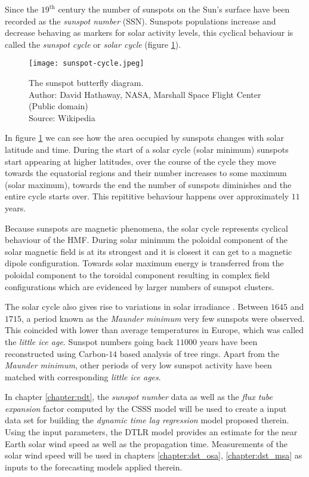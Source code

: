 Since the $19^{\text{th}}$ century the number of sunspots on the Sun's surface have been recorded as the 
\emph{sunspot number} (SSN). Sunspots populations increase and decrease behaving as markers for solar activity levels, 
this cyclical behaviour is called the \emph{sunspot cycle} or \emph{solar cycle} (figure \ref{fig:SolarCycle}). 

\begin{figure}
    \noindent\texttt{[image: sunspot-cycle.jpeg]}
    \caption{\small{The sunspot butterfly diagram.  \\ 
    Author: David Hathaway, NASA, Marshall Space Flight Center (Public domain) \\ 
    Source: Wikipedia}}
    \label{fig:SolarCycle}
\end{figure}

In figure \ref{fig:SolarCycle} we can see how the area occupied by sunspots changes with solar latitude and time. 
During the start of a solar cycle (solar minimum) sunspots start appearing at higher latitudes, over the course 
of the cycle they move towards the equatorial regions and their number increases to some maximum (solar maximum), 
towards the end the number of sunspots diminishes and the entire cycle starts over. This repititive behaviour 
happens over approximately $11$ years.

Because sunspots are magnetic phenomena, the solar cycle represents cyclical behaviour of the HMF. During solar 
minimum the poloidal component of the solar magnetic field is at its strongest and it is closest it can get to 
a magnetic dipole configuration. Towards solar maximum energy is transferred from the poloidal component to the 
toroidal component resulting in complex field configurations which are evidenced by larger numbers of sunspot 
clusters.

The solar cycle also gives rise to variations in solar irradiance \citep{solarirradiance}. Between $1645$ and 
$1715$, a period known as the \emph{Maunder minimum} very few sunspots were observed. This coincided with lower 
than average temperatures in Europe, which was called the \emph{little ice age}. Sunspot numbers going back $11000$ 
years have been reconstructed using Carbon-$14$ based analysis of tree rings. Apart from the \emph{Maunder minimum},
other periods of very low sunspot activity have been matched with corresponding \emph{little ice ages}.

In chapter \ref{chapter:pdt}, the \emph{sunspot number} data as well as the \emph{flux tube expansion} factor 
computed by the CSSS model will be used to create a input data set for building the \emph{dynamic time lag regression} 
model proposed therein. Using the input parameters, the DTLR model provides an estimate for the near Earth solar wind speed as 
well as the propagation time. Measurements of the solar wind speed will be used in chapters \ref{chapter:dst_osa}, 
\ref{chapter:dst_msa} as inputs to the forecasting models applied therein.


